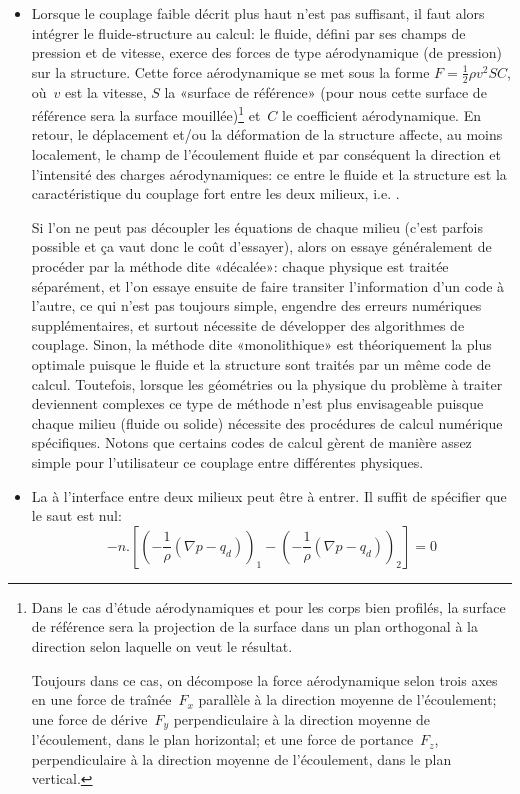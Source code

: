 \begin{itemize}
   \item Lorsque le couplage faible décrit plus haut n'est pas suffisant, il faut alors intégrer le  fluide-structure au calcul: le fluide, défini par ses champs de pression et de vitesse, exerce des forces de type aérodynamique (de pression) sur la structure. Cette force aérodynamique se met sous la forme $F = \frac12 \rho v^2SC$, où~$v$ est la vitesse, $S$ la «surface de référence» (pour nous cette surface de référence sera la surface mouillée)\footnote{Dans le cas d'étude aérodynamiques et pour les corps bien profilés, la surface de référence sera la projection de la surface dans un plan orthogonal à la direction selon laquelle on veut le résultat.
   
   Toujours dans ce cas, on décompose la force aérodynamique selon trois axes en une force de traînée~$F_x$ parallèle à la direction moyenne de l'écoulement; une force de dérive~$F_y$ perpendiculaire à la direction moyenne de l'écoulement, dans le plan horizontal; et une force de portance~$F_z$, perpendiculaire à la direction moyenne de l'écoulement, dans le plan vertical.} et~$C$ le coefficient aérodynamique. En retour, le déplacement et/ou la déformation de la structure affecte, au moins localement, le champ de l'écoulement fluide et par conséquent la direction et l'intensité des charges aérodynamiques: ce  entre le fluide et la structure est la caractéristique du couplage fort entre les deux milieux, i.e. .

Si l'on ne peut pas découpler les équations de chaque milieu (c'est parfois possible et ça vaut donc le coût d'essayer), alors on essaye généralement de procéder par la méthode dite «décalée»: chaque physique est traitée séparément, et l'on essaye ensuite de faire transiter l'information d'un code à l'autre, ce qui n'est pas toujours simple, engendre des erreurs numériques supplémentaires, et surtout nécessite de développer des algorithmes de couplage. Sinon, la méthode dite «monolithique» est théoriquement la plus optimale puisque le fluide et la structure sont traités par un même code de calcul. Toutefois, lorsque les géométries ou la physique du problème à traiter deviennent complexes ce type de méthode n'est plus envisageable puisque chaque milieu (fluide ou solide) nécessite des procédures de calcul numérique spécifiques.
Notons que certains codes de calcul gèrent de manière assez simple pour l'utilisateur ce couplage entre différentes physiques.

   \item La  à l'interface entre deux milieux peut être à entrer. Il suffit de spécifier que le saut est nul:
   \begin{equation}
   -n.\left[\left(-\dfrac1{\rho}(\nabla p-q_d)\right)_1 - \left(-\dfrac1{\rho}(\nabla p-q_d)\right)_2\right] =0
   \end{equation}
\end{itemize}
